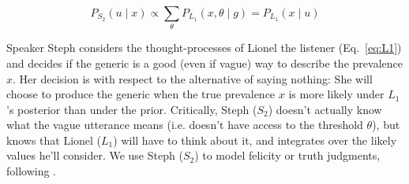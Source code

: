 \documentclass[10pt,letterpaper]{article}
\begin{document}
\begin{equation} 
P_{S_{2}}(u \mid x) \propto  \sum_{\theta} P_{L_{1}}(x , \theta \mid g) =  P_{L_{1}}(x \mid u)
\label{eq:S2}
\end{equation}

Speaker Steph considers the thought-processes of Lionel the listener (Eq.~\ref{eq:L1}) and decides if the generic is a good (even if vague) way to describe the prevalence $x$. 
Her decision is with respect to the alternative of saying nothing: She will choose to produce the generic when the true prevalence $x$ is more likely under $L_1$'s posterior than under the prior. 
Critically, Steph ($S_{2}$) doesn't actually know what the vague utterance means (i.e. doesn't have access to the threshold $\theta$), but knows that Lionel ($L_{1}$) will have to think about it, and integrates over the likely values he'll consider.
We use Steph ($S_{2}$) to model felicity or truth judgments, following .
%


%
\end{document}
